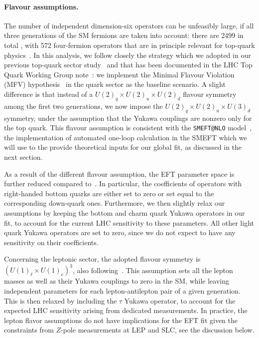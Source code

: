 \paragraph{Flavour assumptions.}
%
The number of independent dimension-six operators can be unfeasibly large, if all three
generations of the SM fermions are taken into account: there are 2499 in total
\cite{Alonso:2013hga}, with 572 four-fermion operators that are in principle relevant for top-quark
physics~\cite{AguilarSaavedra:2010zi}.
%
In this analysis, we follow closely the strategy which we adopted in our previous top-quark
sector study~\cite{Hartland:2019bjb} and that has been documented in the LHC Top
Quark Working Group note~\cite{AguilarSaavedra:2018nen}: we implement the
Minimal Flavour Violation (MFV) hypothesis~\cite{DAmbrosio:2002vsn} in the
quark sector as the baseline scenario.
%
A slight difference is that instead of a $U(2)_q\times U(2)_u \times U(2)_d$
flavour symmetry among the first two generations,
we now impose the $U(2)_q\times U(2)_u \times U(3)_d$ symmetry,
under the assumption that the Yukawa couplings are nonzero only for the top quark.
%
This flavour assumption is consistent with the {\tt SMEFT@NLO} model~\cite{Degrande:2020evl},
the implementation of automated one-loop calculation in the SMEFT which we will use to the provide
theoretical inputs for our global fit, as discussed in the next section.

As a result of the different flavour assumption,
the EFT parameter space is further
reduced compared to~\cite{Hartland:2019bjb}.
%
In particular, the coefficients of operators with right-handed bottom quarks
are either set to zero or set equal to the corresponding down-quark ones.
%
Furthermore, we then slightly relax our assumptions by keeping the bottom and
charm quark Yukawa operators in our fit, to account for the current LHC
sensitivity to these parameters.
%
All other light quark Yukawa operators are set to zero,
since we do not expect to have any sensitivity on their coefficients.

Concerning the leptonic sector, the adopted flavour symmetry is $(U(1)_\ell \times
U(1)_e)^3$, also following~\cite{AguilarSaavedra:2018nen}.
%
This assumption sets all the lepton masses as well as their Yukawa couplings to
zero in the SM, while leaving independent parameters for each lepton-antilepton
pair of a given generation.
This is then relaxed by including the $\tau$ Yukawa operator, to account 
for the expected LHC sensitivity arising from dedicated measurements.
%
In practice, the lepton flavor assumptions do not have implications for the EFT fit
given the constraints from $Z$-pole measurements at LEP and SLC, see the discussion below.

